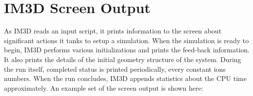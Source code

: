 
\section{IM3D Screen Output}

As IM3D reads an input script, it prints information to the screen about significant actions it tanks to setup a simulation. When the simulation is ready to begin, IM3D performs various initializations and prints the feed-back information. It also prints the details of the initial geometry structure of the system. During the run itself, completed status is printed periodically, every constant ions numbers. When the run concludes, IM3D appends statistics about the CPU time approximately. An example set of the screen output is shown here:

